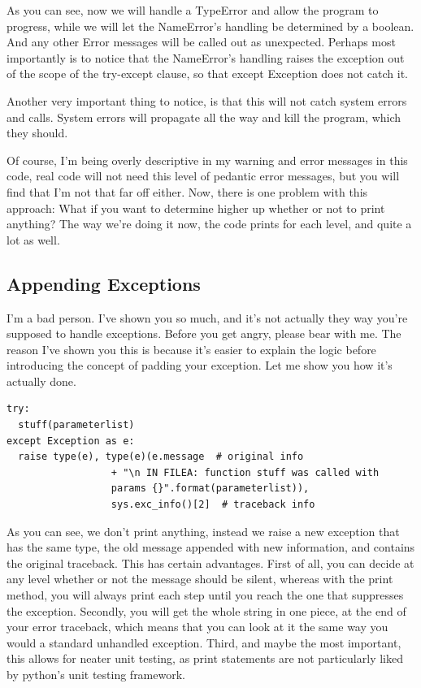 \documentclass[10pt,a4paper]{article}
\begin{document}
As you can see, now we will handle a TypeError and allow the program to progress, while we will let the NameError's handling be determined by a boolean. And any other Error messages will be called out as unexpected. Perhaps most importantly is to notice that the NameError's handling raises the exception out of the scope of the try-except clause, so that except Exception does not catch it.

Another very important thing to notice, is that this will not catch system errors and calls. System errors will propagate all the way and kill the program, which they should. 

Of course, I'm being overly descriptive in my warning and error messages in this code, real code will not need this level of pedantic error messages, but you will find that I'm not that far off either. Now, there is one problem with this approach: What if you want to determine higher up whether or not to print anything? The way we're doing it now, the code prints for each level, and quite a lot as well.

\subsection{Appending Exceptions}

I'm a bad person. I've shown you so much, and it's not actually they way you're supposed to handle exceptions. Before you get angry, please bear with me. The reason I've shown you this is because it's easier to explain the logic before introducing the concept of padding your exception. Let me show you how it's actually done.

\begin{lstlisting}
try: 
  stuff(parameterlist)
except Exception as e:
  raise type(e), type(e)(e.message  # original info
                  + "\n IN FILEA: function stuff was called with 
                  params {}".format(parameterlist)), 
                  sys.exc_info()[2]  # traceback info
\end{lstlisting}

As you can see, we don't print anything, instead we raise a new exception that has the same type, the old message appended with new information, and contains the original traceback. This has certain advantages. First of all, you can decide at any level whether or not the message should be silent, whereas with the print method, you will always print each step until you reach the one that suppresses the exception. Secondly, you will get the whole string in one piece, at the end of your error traceback, which means that you can look at it the same way you would a standard unhandled exception. Third, and maybe the most important, this allows for neater unit testing, as print statements are not particularly liked by python's unit testing framework. 
\end{document}
